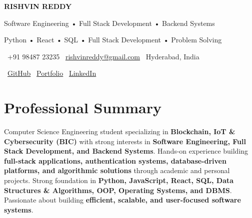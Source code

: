 \documentclass[a4paper,11pt]{article}
\begin{document}

\begin{center}

{\Huge \textbf{RISHVIN REDDY}}

\vspace{4pt}

{\large Software Engineering • Full Stack Development • Backend Systems}

\vspace{5pt}

{\small
Python • React • SQL • Full Stack Development • Problem Solving
}

\vspace{8pt}

\small
\faPhone\ +91 98487 23235 \hspace{12pt}
\faEnvelope\ \href{mailto:rishvinreddy@gmail.com}{rishvinreddy@gmail.com}
\hspace{12pt}
\faMapMarker*\ Hyderabad, India

\vspace{6pt}

\faGithub\ 
\href{https://github.com/RishvinReddy}{GitHub}
\hspace{14pt}
\faGlobe\
\href{https://rishvinreddy.github.io}{Portfolio}
\hspace{14pt}
\faLinkedin\
\href{https://www.linkedin.com/in/rishvinreddy/}{LinkedIn}

\end{center}

\vspace{-8pt}



\section{Professional Summary}

Computer Science Engineering student specializing in \textbf{Blockchain, IoT \& Cybersecurity (BIC)} with strong interests in \textbf{Software Engineering, Full Stack Development, and Backend Systems}. Hands-on experience building \textbf{full-stack applications, authentication systems, database-driven platforms, and algorithmic solutions} through academic and personal projects. Strong foundation in \textbf{Python, JavaScript, React, SQL, Data Structures \& Algorithms, OOP, Operating Systems, and DBMS}. Passionate about building \textbf{efficient, scalable, and user-focused software systems}.
\end{document}
